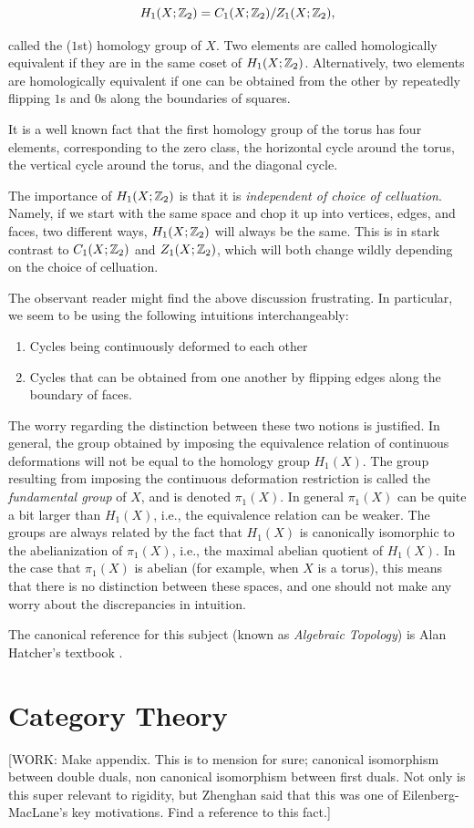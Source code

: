 \documentclass{article}
\theoremstyle{definition}
\numberwithin{figure}{section}
\begin{document}
$$H_1(X;\mathbb{Z}_2)=C_1(X;\mathbb{Z}_2)/Z_1(X;\mathbb{Z}_2),$$

called the ($1$st) homology group of $X$. Two elements are called homologically equivalent if they are in the same coset of $H_1(X;\mathbb{Z}_2)$. Alternatively, two elements are homologically equivalent if one can be obtained from the other by repeatedly flipping $1$s and $0$s along the boundaries of squares.

It is a well known fact that the first homology group of the torus has four elements, corresponding to the zero class, the horizontal cycle around the torus, the vertical cycle around the torus, and the diagonal cycle.

The importance of $H_1(X;\mathbb{Z}_2)$ is that it is \textit{independent of choice of celluation}. Namely, if we start with the same space and chop it up into vertices, edges, and faces, two different ways, $H_1(X;\mathbb{Z}_2)$ will always be the same. This is in stark contrast to $C_1(X;\mathbb{Z}_2)$ and $Z_1(X;\mathbb{Z}_2)$, which will both change wildly depending on the choice of celluation.

The observant reader might find the above discussion frustrating. In particular, we seem to be using the following intuitions interchangeably:

\begin{enumerate}
\item Cycles being continuously deformed to each other
\item Cycles that can be obtained from one another by flipping edges along the boundary of faces.
\end{enumerate}

The worry regarding the distinction between these two notions is justified. In general, the group obtained by imposing the equivalence relation of continuous deformations will not be equal to the homology group $H_1(X)$. The group resulting from imposing the continuous deformation restriction is called the \textit{fundamental group} of $X$, and is denoted $\pi_1(X)$. In general $\pi_1(X)$ can be quite a bit larger than $H_1(X)$, i.e., the equivalence relation can be weaker. The groups are always related by the fact that $H_1(X)$ is canonically isomorphic to the abelianization of $\pi_1(X)$, i.e., the maximal abelian quotient of $H_1(X)$. In the case that $\pi_1(X)$ is abelian (for example, when $X$ is a torus), this means that there is no distinction between these spaces, and one should not make any worry about the discrepancies in intuition.

The canonical reference for this subject (known as \textit{Algebraic Topology}) is Alan Hatcher's textbook \cite{hatcher2005algebraic}.

\section{Category Theory}
\label{Categories}
[WORK: Make appendix. This is to mension for sure; canonical isomorphism between double duals, non canonical isomorphism between first duals. Not only is this super relevant to rigidity, but Zhenghan said that this was one of Eilenberg-MacLane's key motivations. Find a reference to this fact.]




\end{document}
